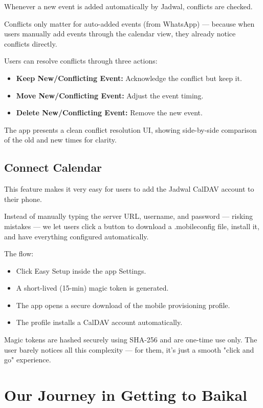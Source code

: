 Whenever a new event is added automatically by Jadwal, conflicts are checked.

Conflicts only matter for auto-added events (from WhatsApp) — because when users manually add events through the calendar view, they already notice conflicts directly.

Users can resolve conflicts through three actions: \begin{itemize} \item \textbf{Keep New/Conflicting Event:} Acknowledge the conflict but keep it. \item \textbf{Move New/Conflicting Event:} Adjust the event timing. \item \textbf{Delete New/Conflicting Event:} Remove the new event. \end{itemize}

The app presents a clean conflict resolution UI, showing side-by-side comparison of the old and new times for clarity.

\subsection{Connect Calendar} \label{subsec:connect-calendar}

This feature makes it very easy for users to add the Jadwal CalDAV account to their phone.

Instead of manually typing the server URL, username, and password — risking mistakes — we let users click a button to download a .mobileconfig file, install it, and have everything configured automatically.

The flow: \begin{itemize} \item Click Easy Setup inside the app Settings. \item A short-lived (15-min) magic token is generated. \item The app opens a secure download of the mobile provisioning profile. \item The profile installs a CalDAV account automatically. \end{itemize}

Magic tokens are hashed securely using SHA-256 and are one-time use only. The user barely notices all this complexity — for them, it’s just a smooth "click and go" experience.

\section{Our Journey in Getting to Baikal}


